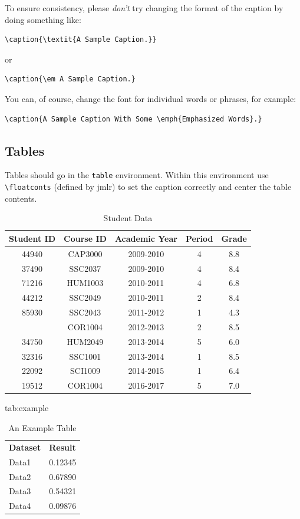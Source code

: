 \documentclass[pmlr]{jmlr}%
\begin{document}
To ensure consistency, please \emph{don't} try changing the format of the caption by doing
something like:
\begin{verbatim}
\caption{\textit{A Sample Caption.}}
\end{verbatim}
or
\begin{verbatim}
\caption{\em A Sample Caption.}
\end{verbatim}
You can, of course, change the font for individual words or 
phrases, for example:
\begin{verbatim}
\caption{A Sample Caption With Some \emph{Emphasized Words}.}
\end{verbatim}

\subsection{Tables}
\label{sec:tables}

Tables should go in the \texttt{table} environment. Within this
environment use \verb|\floatconts| (defined by \textsf{jmlr})
to set the caption correctly and center the table contents.

\begin{table}[t]
	
	\caption{\label{tab:}Student Data \label{tab:data-student}}
	\centering
	\begin{tabular}{ccccc}
		\toprule
		Student ID & Course ID & Academic Year & Period & Grade\\
		\midrule
		44940 & CAP3000 & 2009-2010 & 4 & 8.8\\
		37490 & SSC2037 & 2009-2010 & 4 & 8.4\\
		71216 & HUM1003 & 2010-2011 & 4 & 6.8\\
		44212 & SSC2049 & 2010-2011 & 2 & 8.4\\
		85930 & SSC2043 & 2011-2012 & 1 & 4.3\\
		\addlinespace
		14492 & COR1004 & 2012-2013 & 2 & 8.5\\
		34750 & HUM2049 & 2013-2014 & 5 & 6.0\\
		32316 & SSC1001 & 2013-2014 & 1 & 8.5\\
		22092 & SCI1009 & 2014-2015 & 1 & 6.4\\
		19512 & COR1004 & 2016-2017 & 5 & 7.0\\
		\bottomrule
	\end{tabular}
\end{table}

\begin{table}[htbp]
\floatconts
  {tab:example}%
  {\caption{An Example Table}}%
  {\begin{tabular}{ll}
  \bfseries Dataset & \bfseries Result\\
  Data1 & 0.12345\\
  Data2 & 0.67890\\
  Data3 & 0.54321\\
  Data4 & 0.09876
  \end{tabular}}
\end{table}
\end{document}
